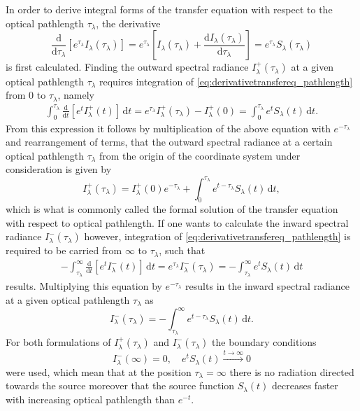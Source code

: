 \documentclass[a4paper,12pt]{report}
\def\lk#1{{\color{black}{#1}}}
\begin{document}
In order to derive integral forms of the transfer equation with respect to the optical pathlength $\tau_\lambda$, the derivative \begin{equation}\label{eq:derivativetransfereq_pathlength}
\frac{\mathrm{d}}{\mathrm{d}\tau_\lambda}\left[e^{\tau_\lambda}I_\lambda(\tau_\lambda)\right] = e^{\tau_\lambda}\left[I_\lambda(\tau_\lambda) + \frac{\mathrm{d}I_\lambda(\tau_\lambda)}{\mathrm{d}\tau_\lambda}\right] = e^{\tau_\lambda}S_\lambda(\tau_\lambda)
\end{equation} is first calculated. Finding the outward spectral radiance $I^+_\lambda(\tau_\lambda)$ at a given optical pathlength $\tau_\lambda$ requires integration of \cref{eq:derivativetransfereq_pathlength} from $0$ to $\tau_\lambda$, namely \begin{gather}
\int_{0}^{\tau_\lambda} \frac{\mathrm{d}}{\mathrm{d}t}\left[e^{t}I^+_\lambda(t)\right]\,\mathrm{d}t = e^{\tau_\lambda}I^+_\lambda(\tau_\lambda) - I^+_\lambda(0) = \int_{0}^{\tau_\lambda}e^t S_\lambda(t)\,\mathrm{d}t.
\end{gather} From this expression it follows by multiplication of the above equation with $e^{-\tau_\lambda}$ and rearrangement of terms, that the outward spectral radiance at a certain optical pathlength $\tau_\lambda$ from the origin of the coordinate system under consideration is given by \begin{equation}\label{eq:formaltransferequationoutward_pathlength}
I^+_\lambda(\tau_\lambda) = I^+_\lambda(0)e^{-\tau_\lambda} + \int_{0}^{\tau_\lambda} e^{t-\tau_\lambda}S_\lambda(t)\,\mathrm{d}t,
\end{equation} which is what is commonly called the formal solution of the transfer equation with respect to optical pathlength. If one wants to calculate the inward spectral radiance $I^-_\lambda(\tau_\lambda)$ however, integration of \cref{eq:derivativetransfereq_pathlength} is required to be carried \lk{out} from $\infty$ to $\tau_\lambda$, such that \begin{gather}
-\int_{\tau_\lambda}^{\infty} \frac{\mathrm{d}}{\mathrm{d}t}\left[e^{t}I^-_\lambda(t)\right]\,\mathrm{d}t = e^{\tau_\lambda}I_\lambda^-(\tau_\lambda) = -\int_{\tau_\lambda}^{\infty}e^t S_\lambda(t)\,\mathrm{d}t
\end{gather} results. Multiplying this equation by $e^{-\tau_\lambda}$ results in the inward spectral radiance at a given optical pathlength $\tau_\lambda$ \lk{calculated} as \begin{equation}\label{eq:formaltransferequationinward_pathlength}
I^-_\lambda(\tau_\lambda) = -\int_{\tau_\lambda}^{\infty}e^{t-\tau_\lambda}S_\lambda(t)\,\mathrm{d}t.
\end{equation} For both formulations of $I_\lambda^+(\tau_\lambda)$ and $I_\lambda^-(\tau_\lambda)$ the boundary conditions \begin{equation}
I_\lambda^-(\infty) = 0, \quad e^tS_\lambda(t) \xrightarrow{t\rightarrow \infty} 0
\end{equation} were used, which mean that at the position $\tau_\lambda = \infty$ there is no radiation directed towards the source \lk{and} moreover that the source function $S_\lambda(t)$ decreases faster with increasing optical pathlength than $e^{-t}$.
\end{document}

